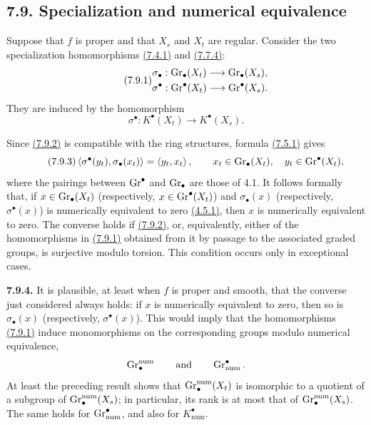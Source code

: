 \subsection*{7.9. Specialization and numerical equivalence}
Suppose that $f$ is proper and that $X_s$ and $X_t$ are regular. Consider
the two specialization homomorphisms \hyperlink{sga6.e10.eq.7-4-1}{(7.4.1)} and \hyperlink{sga6.e10.eq.7-7-4}{(7.7.4)}:
\begin{equation}\tag{7.9.1}
\begin{gathered}
\sigma_\bullet:\operatorname{Gr}_\bullet(X_t)\longrightarrow\operatorname{Gr}_\bullet(X_s),\\
\sigma^\bullet:\operatorname{Gr}^\bullet(X_t)\longrightarrow\operatorname{Gr}^\bullet(X_s).
\end{gathered}
\end{equation}
They are induced by the homomorphism
\begin{equation}\tag{7.9.2}
\sigma^\bullet:K^\bullet(X_t)\longrightarrow K^\bullet(X_s).
\end{equation}

Since \hyperlink{sga6.e10.eq.7-9-2}{(7.9.2)} is compatible with the ring structures, formula \hyperlink{sga6.e10.eq.7-5-1}{(7.5.1)}
gives
\begin{equation}\tag{7.9.3}
\left\langle\sigma^\bullet(y_t),\sigma_\bullet(x_t)\right\rangle
=\left\langle y_t,x_t\right\rangle,
\qquad
x_t\in\operatorname{Gr}_\bullet(X_t),\quad y_t\in\operatorname{Gr}^\bullet(X_t),
\end{equation}
where the pairings between $\operatorname{Gr}^\bullet$ and $\operatorname{Gr}_\bullet$ are those of
4.1. It follows formally that, if $x\in\operatorname{Gr}_\bullet(X_t)$ (respectively,
$x\in\operatorname{Gr}^\bullet(X_t)$) and $\sigma_\bullet(x)$ (respectively,
$\sigma^\bullet(x)$) is numerically equivalent to zero \hyperlink{sga6.e10.def.4-5-1}{(4.5.1)}, then $x$
is numerically equivalent to zero. The converse holds if \hyperlink{sga6.e10.eq.7-9-2}{(7.9.2)}, or,
equivalently, either of the homomorphisms in \hyperlink{sga6.e10.eq.7-9-1}{(7.9.1)} obtained from it by passage to
the associated graded groups, is surjective modulo torsion. This condition
occurs only in exceptional cases.

\textbf{7.9.4.}
It is plausible, at least when $f$ is proper and smooth, that the converse
just considered always holds: if $x$ is numerically equivalent to zero,
then so is $\sigma_\bullet(x)$ (respectively, $\sigma^\bullet(x)$). This
would imply that the homomorphisms \hyperlink{sga6.e10.eq.7-9-1}{(7.9.1)} induce monomorphisms on the
corresponding groups modulo numerical equivalence,
\[
\operatorname{Gr}_\bullet^{\mathrm{num}}
\qquad\text{and}\qquad
\operatorname{Gr}_{\mathrm{num}}^\bullet.
\]
At least the preceding result shows that
$\operatorname{Gr}_\bullet^{\mathrm{num}}(X_t)$ is isomorphic to a quotient of a subgroup
of $\operatorname{Gr}_\bullet^{\mathrm{num}}(X_s)$; in particular, its rank is at most
that of $\operatorname{Gr}_\bullet^{\mathrm{num}}(X_s)$. The same holds for
$\operatorname{Gr}_{\mathrm{num}}^\bullet$, and also for $K_{\mathrm{num}}^\bullet$.

